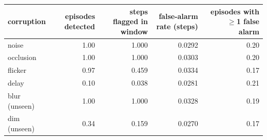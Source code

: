 \begin{tabular}{lrrrr}
\toprule
corruption & episodes detected & steps flagged in window & false-alarm rate (steps) & episodes with $\ge$1 false alarm \\
\midrule
noise & 1.00 & 1.000 & 0.0292 & 0.20 \\
occlusion & 1.00 & 1.000 & 0.0303 & 0.20 \\
flicker & 0.97 & 0.459 & 0.0334 & 0.17 \\
delay & 0.10 & 0.038 & 0.0281 & 0.21 \\
blur (unseen) & 1.00 & 1.000 & 0.0328 & 0.19 \\
dim (unseen) & 0.34 & 0.159 & 0.0270 & 0.17 \\
\bottomrule
\end{tabular}
